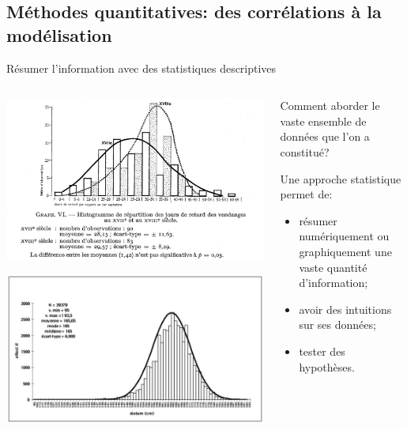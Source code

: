 \documentclass[ignorenonframetext]{beamer}
\begin{document}
\subsection{Méthodes quantitatives: des corrélations à la modélisation}

\begin{frame}{Résumer l'information avec des statistiques descriptives}

\begin{columns}
	\begin{column}{0.45\textwidth}
		\includegraphics[width=1\textwidth]{img/ahess_0395-2649_1974_num_29_3_T1_0608_0000_006.png}
		
		\includegraphics[width=1\textwidth]{img/Taille_conscrits.jpeg}
	\end{column}
	\begin{column}{0.45\textwidth}
		Comment aborder le vaste ensemble de données que l'on a constitué?
		
		Une approche \alert{statistique} permet de:
		\begin{itemize}
			\item résumer numériquement ou graphiquement une vaste quantité d'information;
			\item avoir des intuitions sur ses données;
			\item tester des hypothèses.
		\end{itemize}
		
	\end{column}
\end{columns}

\end{frame}
\end{document}
